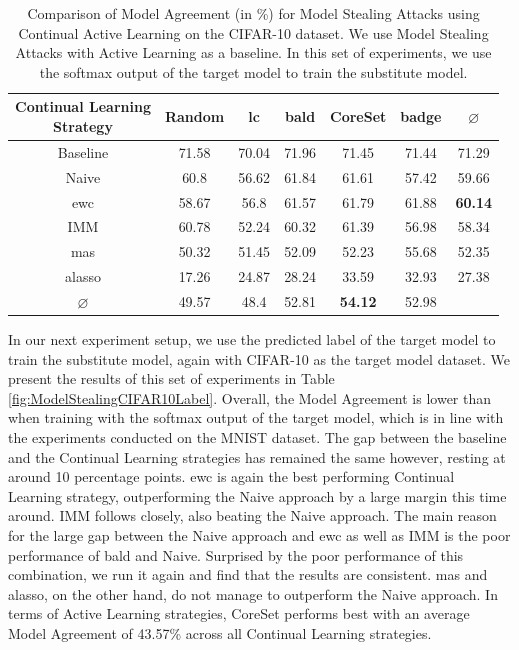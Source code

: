 \begin{table}[h]
    \centering
    \begin{tabular}{c | c c c c c | c} 
        \hline
        \diagbox[width=11em]{Active \\ Learning Strategy}{Continual Learning \\ Strategy} & Random & \gls{lc} & \gls{bald} & CoreSet & \gls{badge} & $\varnothing$\\ 
        \hline 
        Baseline & 71.58 & 70.04 & 71.96 & 71.45 & 71.44 & 71.29\\
        \hline
        Naive & 60.8 & 56.62 & 61.84 & 61.61 & 57.42 & 59.66 \\
        \gls{ewc} & 58.67 & 56.8 & 61.57 & 61.79 & 61.88 & \textbf{60.14}\\
        IMM & 60.78 & 52.24 & 60.32 & 61.39 & 56.98 & 58.34 \\
        \gls{mas} & 50.32 & 51.45 & 52.09 & 52.23 & 55.68 & 52.35\\
        \gls{alasso} & 17.26 & 24.87 & 28.24 & 33.59 & 32.93 & 27.38\\
        \hline
        $\varnothing$ & 49.57 & 48.4 & 52.81 & \textbf{54.12} & 52.98\\
        \hline
    \end{tabular}
    \caption{Comparison of Model Agreement (in \%) for Model Stealing Attacks using Continual Active Learning on the CIFAR-10 dataset. We use Model Stealing Attacks with Active Learning as a baseline. In this set of experiments,
    we use the softmax output of the target model to train the substitute model.}
    \label{fig:ModelStealingCIFAR10Softmax}
\end{table}

In our next experiment setup, we use the predicted label of the target model to train the substitute model, again with CIFAR-10 as the target model dataset. We present the results of this set of experiments in Table \ref{fig:ModelStealingCIFAR10Label}. Overall,
the Model Agreement is lower than when training with the softmax output of the target model, which is in line with the experiments conducted on the MNIST dataset. The gap between the baseline and the Continual Learning strategies has remained the same however,
resting at around 10 percentage points. \gls{ewc} is again the best performing Continual Learning strategy, outperforming the Naive approach by a large margin this time around. IMM follows closely, also beating the Naive approach. The main reason for the large gap
between the Naive approach and \gls{ewc} as well as IMM is the poor performance of \gls{bald} and Naive. Surprised by the poor performance of this combination, we run it again and find that the results are consistent. \gls{mas} and \gls{alasso}, on the other hand, do not manage to
outperform the Naive approach. In terms of Active Learning strategies, CoreSet performs best with an average Model Agreement of 43.57\% across all Continual Learning strategies. \par

